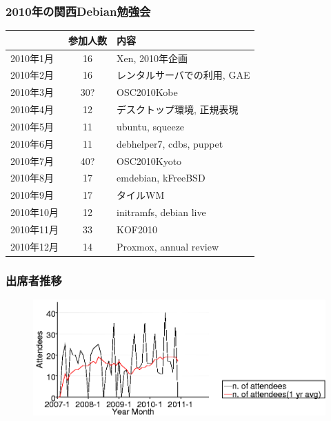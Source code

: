 \documentclass[cjk,dvipdfmx,12pt,%
hyperref={bookmarks=true,bookmarksnumbered=true,bookmarksopen=false,%
colorlinks=false,%
pdftitle={第 42 回 関西 Debian 勉強会},%
pdfauthor={倉敷・のがた・佐々木},%
pdfsubject={資料},%
}]{beamer}
\begin{document}


\begin{frame}[fragile]
\frametitle{2010年の関西Debian勉強会}


 \begin{center}
  \begin{tabular}{|l|c|p{14em}|}
 \hline
 & 参加人数 & 内容 \\
 \hline
2010年1月 & 16 & Xen, 2010年企画 \\
2010年2月 & 16 & レンタルサーバでの利用, GAE \\
2010年3月 & 30? & OSC2010Kobe \\
2010年4月 & 12 & デスクトップ環境, 正規表現 \\
2010年5月 & 11 & ubuntu, squeeze \\
2010年6月 & 11 & debhelper7, cdbs, puppet \\
2010年7月 & 40? & OSC2010Kyoto \\
2010年8月 & 17 & emdebian, kFreeBSD \\
2010年9月 & 17 & タイルWM \\
2010年10月 & 12 & initramfs, debian live \\
2010年11月 & 33 & KOF2010 \\
2010年12月 & 14 & Proxmox, annual review \\
 \hline
  \end{tabular}
 \end{center}


\end{frame}

\begin{frame}[fragile]
\frametitle{出席者推移}


\begin{figure}[h]
 \begin{center}
  \includegraphics[width=1\hsize]{image201012/memberanalysis/kansai.png}
 \end{center}
\end{figure}


\end{frame}
\end{document}
